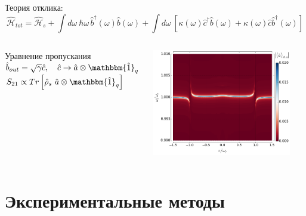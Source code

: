 \documentclass[aspectratio=169, 13pt]{beamer}
\begin{document}
\begin{frame}[c]\frametitle{\secname}\framesubtitle{\subsecname}
Теория отклика:
\centering
\begin{equation*}
\mathcal{\hat H}_{tot} = \mathcal{\hat H}_{s} +\int d\omega\ \hbar \omega\, \hat b^\dag(\omega) \hat b(\omega) + \int d\omega\ [ \kappa(\omega) \hat c^{\dag} \hat b(\omega) + \kappa(\omega)\hat c \hat b^{\dag}(\omega)]
\end{equation*}

\begin{columns}[c]
\begin{block}{Уравнение пропускания}
\centering
$\hat b_{out}= \sqrt{\gamma} \hat c,\quad \hat c \rightarrow \hat a \otimes \mathbbm{\hat 1}_q$\\

\vspace{.5cm}
$S_{21} \propto Tr\left[\hat \rho_s\ \hat a \otimes \mathbbm{\hat 1}_q\right]$
\end{block}
\includegraphics[width=0.9\textwidth]{Rabi_anticrossing_far_dyn}
\end{columns}
\end{frame}


\section{Экспериментальные методы}
\end{document}
